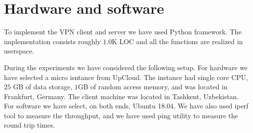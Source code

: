 \section{Hardware and software}
\label{sec:hardware}

To implement the VPN client and server we have used Python framework. The implementation
consists roughly $1.0$K LOC and all the functions are realized in userspace.

During the experiments we have considered the following setup.
For hardware we have selected a micro isntance from UpCloud. The instance had 
single core CPU, $25$ GB of data storage, $1$GB of random access memory, and was 
located in Frankfurt, Germany. The client machine was located in Tashkent, Uzbekistan. 
For software we have select, on both ends, Ubuntu 18.04. We have also used iperf tool 
to measure the throughput, and we have used ping utility to measure the round trip times. 

